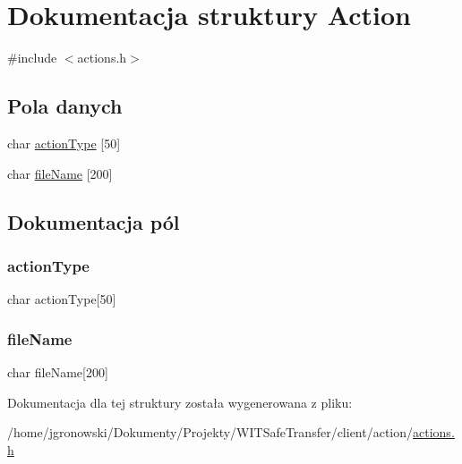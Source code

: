 \hypertarget{struct_action}{}\section{Dokumentacja struktury Action}
\label{struct_action}


{\ttfamily \#include $<$actions.\+h$>$}

\subsection*{Pola danych}
\begin{DoxyCompactItemize}
\item 
char \hyperlink{struct_action_a9d0d5acdb8dc502d8cef149a7712ab0a}{action\+Type} \mbox{[}50\mbox{]}
\item 
char \hyperlink{struct_action_a16afd82f3df65ea705548e5977cce155}{file\+Name} \mbox{[}200\mbox{]}
\end{DoxyCompactItemize}


\subsection{Dokumentacja pól}
\mbox{\label{struct_action_a9d0d5acdb8dc502d8cef149a7712ab0a}} 
\subsubsection{\texorpdfstring{action\+Type}{actionType}}
{\footnotesize\ttfamily char action\+Type\mbox{[}50\mbox{]}}

\mbox{\label{struct_action_a16afd82f3df65ea705548e5977cce155}} 
\subsubsection{\texorpdfstring{file\+Name}{fileName}}
{\footnotesize\ttfamily char file\+Name\mbox{[}200\mbox{]}}



Dokumentacja dla tej struktury została wygenerowana z pliku\+:\begin{DoxyCompactItemize}
\item 
/home/jgronowski/\+Dokumenty/\+Projekty/\+W\+I\+T\+Safe\+Transfer/client/action/\hyperlink{actions_8h}{actions.\+h}\end{DoxyCompactItemize}
